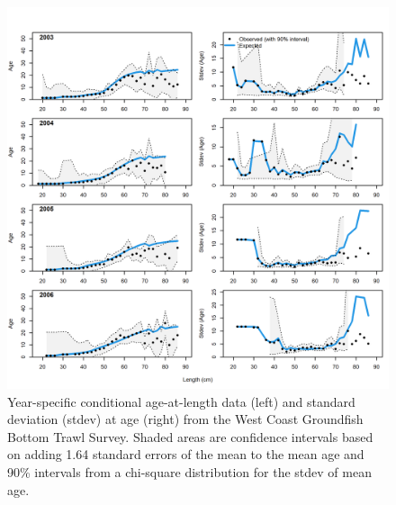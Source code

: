 \documentclass[11pt,
  english,
  a4paper,
]{article}
\begin{document}
\begin{figure}
\centering
\includegraphics[width=1\textwidth,height=1\textheight]{figs/comp_condAALfit_Andre_plotsflt8mkt0_page1.png}
\caption{Year-specific conditional age-at-length data (left) and standard deviation (stdev) at age (right) from the West Coast Groundfish Bottom Trawl Survey. Shaded areas are confidence intervals based on adding 1.64 standard errors of the mean to the mean age and 90\% intervals from a chi-square distribution for the stdev of mean age. \label{fig:acomp_resid_caal1}}
\end{figure}

\tagmcend\tagstructend

\end{document}
